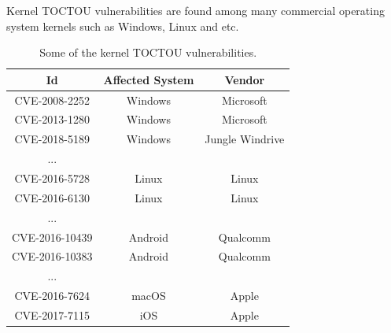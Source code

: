 
Kernel TOCTOU vulnerabilities are found among many commercial operating system kernels such as Windows, Linux and etc.


\begin{center}
\begin{table}
\begin{tabular}{||c c c||}
\hline
Id & Affected System & Vendor \\
\hline
CVE-2008-2252 & Windows & Microsoft \\
CVE-2013-1280 & Windows & Microsoft \\
CVE-2018-5189 & Windows & Jungle Windrive \\
... & & \\

CVE-2016-5728 & Linux & Linux \\
CVE-2016-6130 & Linux & Linux \\
... & & \\

CVE-2016-10439 & Android & Qualcomm \\
CVE-2016-10383 & Android & Qualcomm \\
... & & \\

CVE-2016-7624 & macOS & Apple \\
CVE-2017-7115 & iOS & Apple \\
\hline

\end{tabular}
\caption{Some of the kernel TOCTOU vulnerabilities.}
\label{table:cves}
\end{table}
\end{center}

